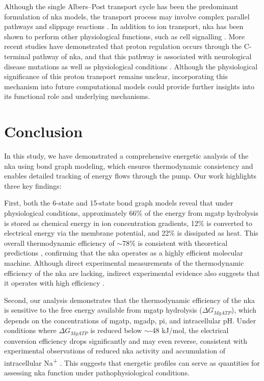 \documentclass{biophys-new}
\newcommand{\rev}[1]{{\color{black} #1}}
\begin{document}
\rev{Although the single Albers--Post transport cycle has been the predominant formulation of \gls{nka} models, the transport process may involve complex parallel pathways and slippage reactions \cite{karlish_conformational_1978}. In addition to ion transport, \gls{nka} has been shown to perform other physiological functions, such as cell signalling \cite{xie2002na}. More recent studies have demonstrated that proton regulation occurs through the C-terminal pathway of \gls{nka}, and that this pathway is associated with neurological disease mutations \cite{poulsen2010neurological} as well as physiological conditions \cite{vedovato2014route}. Although the physiological significance of this proton transport remains unclear, incorporating this mechanism into future computational models could provide further insights into its functional role and underlying mechanisms.}

\section*{Conclusion}

In this study, we have demonstrated a comprehensive energetic analysis of the \gls{nka} using bond graph modeling, which ensures thermodynamic consistency and enables detailed tracking of energy flows through the pump. Our work highlights three key findings:

First, both the 6-state and 15-state bond graph models reveal that under physiological conditions, approximately 66\% of the energy from \gls{mgatp} hydrolysis is stored as chemical energy in ion concentration gradients, 12\% is converted to electrical energy via the membrane potential, and 22\% is dissipated as heat. This overall thermodynamic efficiency of $\sim$78\% is consistent with theoretical predictions \cite{wagoner_mechanisms_2019,peluffo_nak-atpase_2023}, confirming that the \gls{nka} operates as a highly efficient molecular machine. \rev{Although direct experimental measurements of the thermodynamic efficiency of the \gls{nka} are lacking, indirect experimental evidence also suggests that it operates with high efficiency \cite{noske_investigation_2010}.}

Second, our analysis demonstrates that the thermodynamic efficiency of the \gls{nka} is sensitive to the free energy available from \gls{mgatp} hydrolysis ($\Delta G_{MgATP}$), which depends on the concentrations of \gls{mgatp}, \gls{mgadp}, \gls{pi}, and intracellular pH. Under conditions where $\Delta G_{MgATP}$ is reduced below $\sim$-48 kJ/mol, the electrical conversion efficiency drops significantly and may even reverse, consistent with experimental observations of reduced \gls{nka} activity and accumulation of intracellular Na\textsuperscript{+} \cite{glitsch_change_1995,jansen2003energy,nelson_heart_2022}. This suggests that energetic profiles can serve as quantities for assessing \gls{nka} function under pathophysiological conditions.
\end{document}
